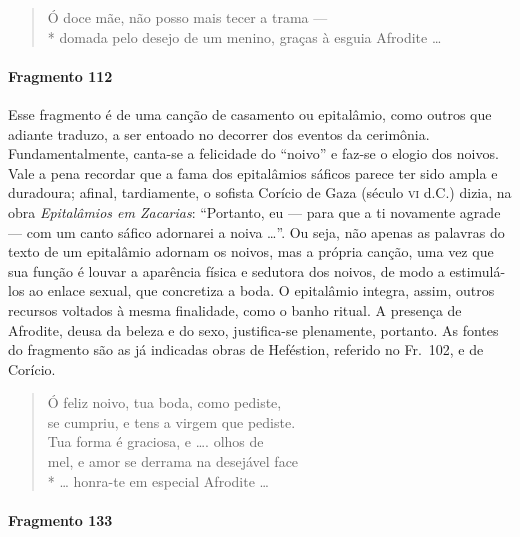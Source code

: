 \begin{verse}
Ó doce mãe, não posso mais tecer a trama --- \\*
domada pelo desejo de um menino, graças à esguia Afrodite \ldots{}
\end{verse}


\paragraph{Fragmento 112}

{\small Esse fragmento é de uma canção de casamento ou epitalâmio, como outros que
adiante traduzo, a ser entoado no decorrer dos eventos da cerimônia.
Fundamentalmente, canta-se a felicidade do ``noivo” e faz-se o elogio
dos noivos. Vale a pena recordar que a fama dos epitalâmios sáficos parece ter
sido ampla e duradoura; afinal, tardiamente, o sofista Corício de Gaza (século
\textsc{vi} d.C.) dizia, na obra \textit{Epitalâmios em Zacarias}: ``Portanto, eu
--- para que a ti novamente agrade --- com um canto sáfico adornarei a noiva \ldots{}”.
Ou seja, não apenas as palavras do texto de um epitalâmio adornam os noivos,
mas a própria canção, uma vez que sua função é louvar a aparência física e
sedutora dos noivos, de modo a estimulá-los ao enlace sexual, que concretiza a
boda. O epitalâmio integra, assim, outros recursos voltados à mesma finalidade,
como o banho ritual. A presença de Afrodite, deusa da beleza e do sexo,
justifica-se plenamente, portanto. As fontes do fragmento são as já indicadas
obras de Heféstion, referido no Fr.~102, e de Corício.}

\begin{verse}
Ó feliz noivo, tua boda, como pediste,\\
se cumpriu, e tens a virgem que pediste.\\
Tua forma é graciosa, e \ldots{}. olhos de\\
mel, e amor se derrama na desejável face\\*
\ldots{} honra-te em especial Afrodite \ldots{}
\end{verse}

\paragraph{Fragmento 133}

